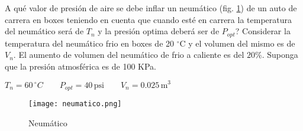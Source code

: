 \item A qué valor de presión de aire se debe inflar un neumático (fig. \ref{fig:neumatico}) de un auto de carrera en boxes teniendo en cuenta que cuando esté en carrera la temperatura del neumático será de $T_n$ y la presión optima deberá ser de $P_{opt}$? Considerar la temperatura del neumático frio en boxes de 20 $^\circ$C y el volumen del mismo es de $V_n$. El aumento de volumen del neumático de frio a caliente es del $20\%$. Suponga que la presión atmosférica es de 100 KPa.

\begin{center}
$T_n = 60 \, ^\circ C \qquad P_{opt} = 40\,\text{psi} \qquad V_n =  0.025\,\text{m}^3$
\end{center}

\begin{figure}[h]
\centering
\texttt{[image: neumatico.png]}
\caption{Neumático}
\label{fig:neumatico}
\end{figure}
